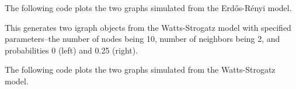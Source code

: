 \documentclass[12pt,twoside]{amherstthesis}
\begin{document}
  The following code plots the two graphs simulated from the Erdős-Rényi
  model.
  
  \begin{Shaded}
  \begin{Highlighting}[]
  \NormalTok{(}\NormalTok{(}\NormalTok{,}\NormalTok{))}
  \NormalTok{, } \NormalTok{)}
  \NormalTok{, } \NormalTok{)}
  \end{Highlighting}
  \end{Shaded}
  
  This generates two igraph objects from the Watts-Strogatz model with
  specified parameters--the number of nodes being 10, number of neighbors
  being 2, and probabilities 0 (left) and 0.25 (right).
  
  \begin{Shaded}
  \begin{Highlighting}[]
  \NormalTok{(}\NormalTok{)}
  
  \StringTok{ }\NormalTok{(} \NormalTok{, } \NormalTok{, } \NormalTok{, } \NormalTok{)}
  \StringTok{ }\NormalTok{(} \NormalTok{, } \NormalTok{, } \NormalTok{, } \NormalTok{)}
  \end{Highlighting}
  \end{Shaded}
  
  The following code plots the two graphs simulated from the
  Watts-Strogatz model.
  
  \begin{Shaded}
  \begin{Highlighting}[]
  \NormalTok{(}\NormalTok{(}\NormalTok{,}\NormalTok{))}
  \NormalTok{, } \NormalTok{)}
  \NormalTok{, } \NormalTok{)}
  \end{Highlighting}
  \end{Shaded}
  
\end{document}
